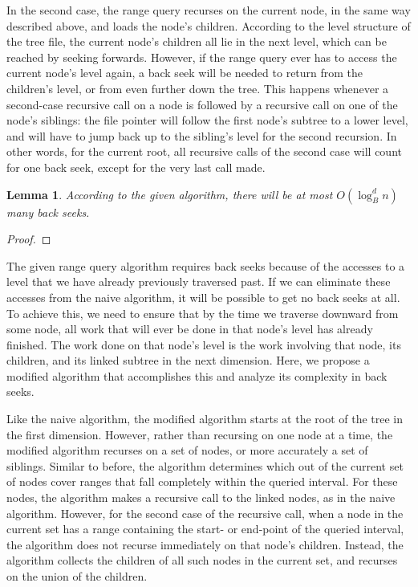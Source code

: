 \documentclass[11pt, oneside]{article}
\newtheorem*{lemma}{Lemma}
\begin{document}
In the second case, the range query recurses on the current node, in the same
way described above, and loads the node's children. According to the level
structure of the tree file, the current node's children all lie in the next
level, which can be reached by seeking forwards. However, if the range query
ever has to access the current node's level again, a back seek will be needed to
return from the children's level, or from even further down the tree.  This
happens whenever a second-case recursive call on a node is followed by a
recursive call on one of the node's siblings: the file pointer will follow the
first node's subtree to a lower level, and will have to jump back up to the
sibling's level for the second recursion. In other words, for the current root,
all recursive calls of the second case will count for one back seek, except for
the very last call made. 

\begin{lemma}
    According to the given algorithm, there will be at most $O(\log_B^dn)$ many
    back seeks.
\end{lemma}
\begin{proof}
\end{proof}

The given range query algorithm requires back seeks because of the accesses to
a level that we have already previously traversed past. If we can eliminate
these accesses from the naive algorithm, it will be possible to get no back
seeks at all. To achieve this, we need to ensure that by the time we traverse
downward from some node, all work that will ever be done in that node's level
has already finished. The work done on that node's level is the work involving
that node, its children, and its linked subtree in the next dimension. Here, we
propose a modified algorithm that accomplishes this and analyze its complexity
in back seeks.

Like the naive algorithm, the modified algorithm starts at the root of the tree
in the first dimension. However, rather than recursing on one node at a time,
the modified algorithm recurses on a set of nodes, or more accurately a set of
siblings. Similar to before, the algorithm determines which out of the current
set of nodes cover ranges that fall completely within the queried interval. For
these nodes, the algorithm makes a recursive call to the linked nodes, as in
the naive algorithm. However, for the second case of the recursive call, when a
node in the current set has a range containing the start- or end-point of the
queried interval, the algorithm does not recurse immediately on that node's
children. Instead, the algorithm collects the children of all such nodes in the
current set, and recurses on the union of the children.
\end{document}
